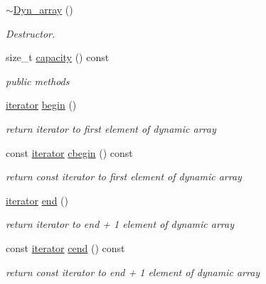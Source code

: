 \begin{DoxyCompactItemize}
\mbox{\label{classDyn__array_ae614e37ca129444d7125483d461fa8d5}} 
\hyperlink{classDyn__array_ae614e37ca129444d7125483d461fa8d5}{$\sim$\+Dyn\+\_\+array} ()
\begin{DoxyCompactList}\small\item\em Destructor. \end{DoxyCompactList}\item 
size\+\_\+t \hyperlink{classDyn__array_a36c5289ec13ee40366fe3b095b2347bf}{capacity} () const
\begin{DoxyCompactList}\small\item\em public methods \end{DoxyCompactList}\item 
\hyperlink{classDyn__array_1_1iterator}{iterator} \hyperlink{classDyn__array_ad6191fc9efb3505a13de70bc0cc5db3e}{begin} ()
\begin{DoxyCompactList}\small\item\em return iterator to first element of dynamic array \end{DoxyCompactList}\item 
\mbox{\label{classDyn__array_aad61b279bf883aa67f904a93dc1622e1}} 
const \hyperlink{classDyn__array_1_1iterator}{iterator} \hyperlink{classDyn__array_aad61b279bf883aa67f904a93dc1622e1}{cbegin} () const
\begin{DoxyCompactList}\small\item\em return const iterator to first element of dynamic array \end{DoxyCompactList}\item 
\mbox{\label{classDyn__array_af728c3e6b4191f59dfea556dd506ccdc}} 
\hyperlink{classDyn__array_1_1iterator}{iterator} \hyperlink{classDyn__array_af728c3e6b4191f59dfea556dd506ccdc}{end} ()
\begin{DoxyCompactList}\small\item\em return iterator to end + 1 element of dynamic array \end{DoxyCompactList}\item 
\mbox{\label{classDyn__array_a1f3d9e5788e2fd180e2769c3aa0690bd}} 
const \hyperlink{classDyn__array_1_1iterator}{iterator} \hyperlink{classDyn__array_a1f3d9e5788e2fd180e2769c3aa0690bd}{cend} () const
\begin{DoxyCompactList}\small\item\em return const iterator to end + 1 element of dynamic array \end{DoxyCompactList}\item 

\end{DoxyCompactItemize}

